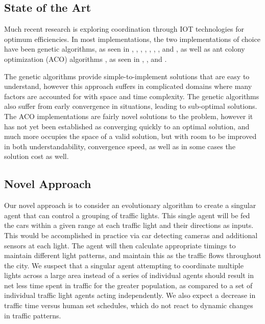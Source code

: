 \documentclass[twocolumn]{article}
\begin{document}
\subsection{State of the Art}

Much recent research is exploring coordination through IOT technologies for optimum efficiencies. In most implementations, the two implementations of choice have been genetic algorithms, as seen in \cite{Turky}, \cite{Gora},  \cite{Nwiabu},  \cite{Sofronova}, \cite{Semet}, \cite{Mao},  \cite{Tan}, and  \cite{Fujdiak}, as well as ant colony optimization (ACO) algorithms , as seen in \cite{Rida}, \cite{Dang-Nhac}, and \cite{Nguyen}.

The genetic algorithms provide simple-to-implement solutions that are easy to understand, however this approach suffers in complicated domains where many factors are accounted for with space and time complexity. The genetic algorithms also suffer from early convergence in situations, leading to sub-optimal solutions. The ACO implementations are fairly novel solutions to the problem, however it has not yet been established as converging quickly to an optimal solution, and much more occupies the space of a valid solution, but with room to be improved in both understandability, convergence speed, as well as in some cases the solution cost as well.

\subsection{Novel Approach}

Our novel approach is to consider an evolutionary algorithm to create a singular agent that can control a grouping of traffic lights. This single agent will be fed the cars within a given range at each traffic light and their directions as inputs. This would be accomplished in practice via car detecting cameras and additional sensors at each light. The agent will then calculate appropriate timings to maintain different light patterns, and maintain this as the traffic flows throughout the city. We suspect that a singular agent attempting to coordinate multiple lights across a large area instead of a series of individual agents should result in net less time spent in traffic for the greater population, as compared to a set of individual traffic light agents acting independently. We also expect a decrease in traffic time versus human set schedules, which do not react to dynamic changes in traffic patterns.
\end{document}
